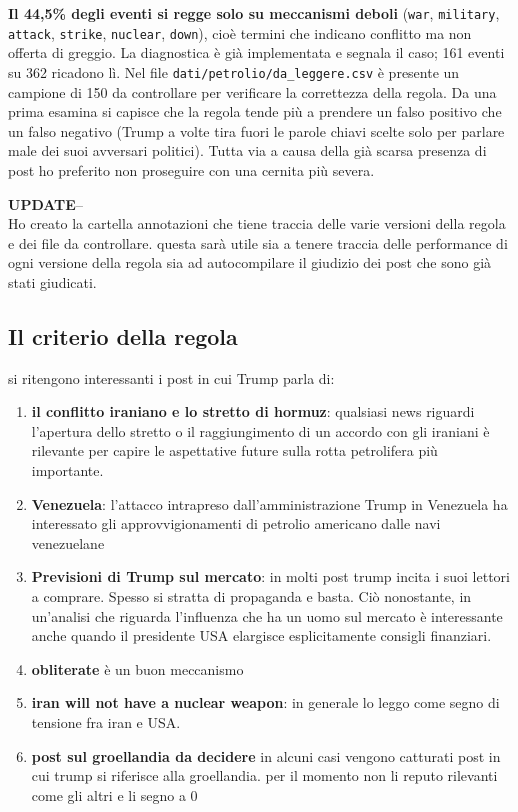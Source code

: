 \documentclass[11pt,a4paper]{article}
\begin{document}
\textbf{Il 44,5\% degli eventi si regge solo su meccanismi deboli}
(\texttt{war}, \texttt{military}, \texttt{attack}, \texttt{strike},
\texttt{nuclear}, \texttt{down}), cioè termini che indicano conflitto ma non
offerta di greggio. La diagnostica è già implementata e segnala il caso; 161
eventi su 362 ricadono lì. 
Nel file \texttt{dati/petrolio/da\_leggere.csv} è presente un campione di 150 da controllare per verificare
la correttezza della regola. Da una prima esamina si capisce che la regola tende più 
a prendere un falso positivo che un falso negativo (Trump a volte tira fuori 
le parole chiavi scelte solo per parlare male dei suoi avversari politici).
Tutta via a causa della già scarsa presenza di post ho preferito non proseguire
con una cernita più severa. 

\textbf{UPDATE}-- \\
Ho creato la cartella annotazioni che tiene traccia delle varie versioni della regola e dei file da controllare. 
questa sarà utile sia a tenere traccia delle performance di ogni versione della regola sia ad autocompilare il giudizio dei post che sono già stati giudicati.

\subsection{Il criterio della regola}
si ritengono interessanti i post in cui Trump parla di: 
\begin{enumerate}
  \item \textbf{il conflitto iraniano e lo stretto di hormuz}: qualsiasi news riguardi l'apertura dello stretto o il raggiungimento di un accordo con gli iraniani è rilevante per capire le aspettative future sulla rotta petrolifera più importante. 
  \item \textbf{Venezuela}: l'attacco intrapreso dall'amministrazione Trump in Venezuela ha interessato gli approvvigionamenti di petrolio americano dalle navi venezuelane 
  \item \textbf{Previsioni di Trump sul mercato}: in molti post trump incita i suoi lettori a comprare. Spesso si stratta di propaganda e basta. Ciò nonostante, in un'analisi che riguarda l'influenza che ha un uomo sul mercato è interessante anche quando il presidente USA elargisce esplicitamente consigli finanziari. 
 \item \textbf{obliterate} è un buon meccanismo
 \item \textbf{iran will not have a nuclear weapon}: in generale lo leggo come segno di tensione fra iran e USA.
 \item \textbf{post sul groellandia da decidere} in alcuni casi vengono catturati post in cui trump si riferisce alla groellandia. per il momento non li reputo rilevanti come gli altri e li segno a 0
\end{enumerate}
\end{document}
